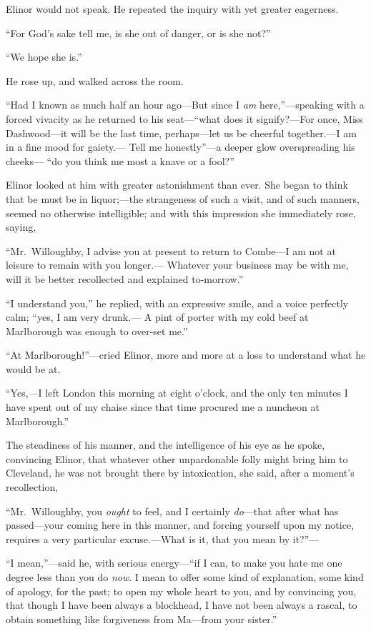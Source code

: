 \documentclass{article}
\begin{document}
Elinor would not speak.  He repeated the inquiry with
yet greater eagerness.

``For God's sake tell me, is she out of danger, or is she not?''

``We hope she is.''

He rose up, and walked across the room.

``Had I known as much half an hour ago---But
since I \emph{am} here,''---speaking with a forced vivacity as he
returned to his seat---``what does it signify?---For once,
Miss Dashwood---it will be the last time, perhaps---let us
be cheerful together.---I am in a fine mood for gaiety.---%
Tell me honestly''---a deeper glow overspreading his cheeks---%
``do you think me most a knave or a fool?''

Elinor looked at him with greater astonishment than ever.
She began to think that be must be in liquor;---the
strangeness of such a visit, and of such manners,
seemed no otherwise intelligible; and with this impression
she immediately rose, saying,

``Mr.\ Willoughby, I advise you at present to return
to Combe---I am not at leisure to remain with you longer.---%
Whatever your business may be with me, will it be better
recollected and explained to-morrow.''

``I understand you,'' he replied, with an expressive smile,
and a voice perfectly calm; ``yes, I am very drunk.---%
A pint of porter with my cold beef at Marlborough was
enough to over-set me.''

``At Marlborough!''---cried Elinor, more and more at
a loss to understand what he would be at.

``Yes,---I left London this morning at eight o'clock,
and the only ten minutes I have spent out of my chaise
since that time procured me a nuncheon at Marlborough.''

The steadiness of his manner, and the intelligence
of his eye as he spoke, convincing Elinor, that whatever
other unpardonable folly might bring him to Cleveland,
he was not brought there by intoxication, she said,
after a moment's recollection,

``Mr.\ Willoughby, you \emph{ought} to feel, and I certainly
\emph{do}---that after what has passed---your coming here in
this manner, and forcing yourself upon my notice,
requires a very particular excuse.---What is it,
that you mean by it?''---%

``I mean,''---said he, with serious energy---``if I can,
to make you hate me one degree less than you do \emph{now}.
I mean to offer some kind of explanation, some kind
of apology, for the past; to open my whole heart to you,
and by convincing you, that though I have been always
a blockhead, I have not been always a rascal, to obtain
something like forgiveness from Ma---from your sister.''
\end{document}
